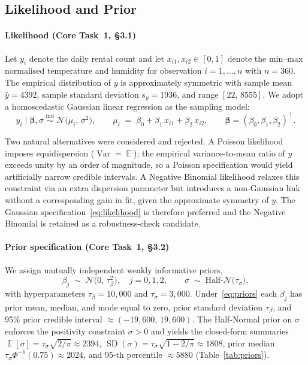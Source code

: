 \subsection{Likelihood and Prior}\label{sec:prior}

\paragraph{Likelihood (Core Task~1, §3.1)}

Let $y_i$ denote the daily rental count and let $x_{i1},x_{i2}\in[0,1]$ denote the min--max normalised temperature and humidity for observation $i=1,\dots,n$ with $n=360$. The empirical distribution of $y$ is approximately symmetric with sample mean $\bar{y}=4392$, sample standard deviation $s_y=1936$, and range $[22,\,8555]$. We adopt a homoscedastic Gaussian linear regression as the sampling model:
\begin{equation}
y_i \mid \boldsymbol{\beta},\sigma \;\stackrel{\text{ind}}{\sim}\; \mathcal{N}\!\bigl(\mu_i,\,\sigma^{2}\bigr),
\qquad
\mu_i \;=\; \beta_0 + \beta_1\,x_{i1} + \beta_2\,x_{i2},
\qquad
\boldsymbol{\beta}=(\beta_0,\beta_1,\beta_2)^{\!\top}.
\label{eq:likelihood}
\end{equation}

Two natural alternatives were considered and rejected. A Poisson likelihood imposes equidispersion ($\operatorname{Var}=\operatorname{\mathbb{E}}$); the empirical variance-to-mean ratio of $y$ exceeds unity by an order of magnitude, so a Poisson specification would yield artificially narrow credible intervals. A Negative Binomial likelihood relaxes this constraint via an extra dispersion parameter but introduces a non-Gaussian link without a corresponding gain in fit, given the approximate symmetry of $y$. The Gaussian specification~\eqref{eq:likelihood} is therefore preferred and the Negative Binomial is retained as a robustness-check candidate.

\paragraph{Prior specification (Core Task~1, §3.2)}

We assign mutually independent weakly informative priors,
\begin{equation}
\beta_j \;\sim\; \mathcal{N}\!\bigl(0,\,\tau_\beta^{2}\bigr),\quad j=0,1,2,
\qquad
\sigma \;\sim\; \mathrm{Half\text{-}}\mathcal{N}\!\bigl(\tau_\sigma\bigr),
\label{eq:priors}
\end{equation}
with hyperparameters $\tau_\beta = 10{,}000$ and $\tau_\sigma = 3{,}000$. Under~\eqref{eq:priors} each $\beta_j$ has prior mean, median, and mode equal to zero, prior standard deviation $\tau_\beta$, and 95\% prior credible interval $\approx(-19{,}600,\,19{,}600)$. The Half-Normal prior on $\sigma$ enforces the positivity constraint $\sigma>0$ and yields the closed-form summaries $\operatorname{\mathbb{E}}[\sigma]=\tau_\sigma\sqrt{2/\pi}\approx 2394$, $\operatorname{SD}(\sigma)=\tau_\sigma\sqrt{1-2/\pi}\approx 1808$, prior median $\tau_\sigma\Phi^{-1}(0.75)\approx 2024$, and 95-th percentile $\approx 5880$ (Table~\ref{tab:priors}).

